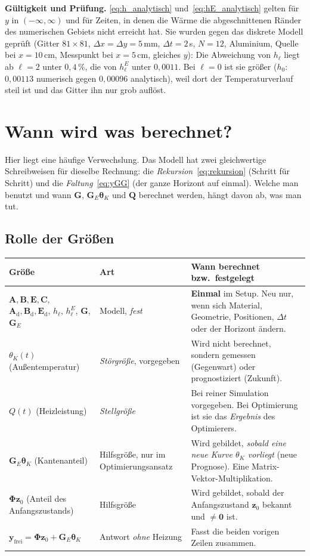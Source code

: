 \documentclass[11pt,a4paper]{article}
\numberwithin{equation}{section}
\newcommand{\dx}{\Delta x}
\newcommand{\dy}{\Delta y}
\newcommand{\dt}{\Delta t}
\newcommand{\thK}{\theta_{K}}
\newcommand{\vthK}{\symbf{\theta}_{K}}
\newcommand{\mA}{\mathbf{A}}
\newcommand{\mB}{\mathbf{B}}
\newcommand{\mE}{\mathbf{E}}
\newcommand{\mC}{\mathbf{C}}
\newcommand{\mG}{\mathbf{G}}
\newcommand{\mGE}{\mathbf{G}_{E}}
\newcommand{\mAd}{\mathbf{A}_{\mathrm d}}
\newcommand{\mBd}{\mathbf{B}_{\mathrm d}}
\newcommand{\mEd}{\mathbf{E}_{\mathrm d}}
\newcommand{\mPhi}{\symbf{\Phi}}
\newcommand{\vz}{\mathbf{z}}
\newcommand{\vy}{\mathbf{y}}
\newcommand{\vQ}{\mathbf{Q}}
\begin{document}
\textbf{Gültigkeit und Prüfung.} \eqref{eq:h_analytisch} und~\eqref{eq:hE_analytisch} gelten für $y$ in $(-\infty,\infty)$ und für Zeiten, in denen die Wärme die abgeschnittenen Ränder des numerischen Gebiets nicht erreicht hat. Sie wurden gegen das diskrete Modell geprüft (Gitter $81\times81$, $\dx=\dy=5$\,mm, $\dt=2$\,s, $N=12$, Aluminium, Quelle bei $x=10$\,cm, Messpunkt bei $x=5$\,cm, gleiches $y$): Die Abweichung von $h_\ell$ liegt ab $\ell=2$ unter $0{,}4\,\%$, die von $h^E_\ell$ unter $0{,}0011$. Bei $\ell=0$ ist sie größer ($h_0$: $0{,}00113$ numerisch gegen $0{,}00096$ analytisch), weil dort der Temperaturverlauf steil ist und das Gitter ihn nur grob auflöst.

\section{Wann wird was berechnet?}
\label{sec:wann}

Hier liegt eine häufige Verwechslung. Das Modell hat zwei gleichwertige Schreibweisen für dieselbe Rechnung: die \emph{Rekursion}~\eqref{eq:rekursion} (Schritt für Schritt) und die \emph{Faltung}~\eqref{eq:yGG} (der ganze Horizont auf einmal). Welche man benutzt und wann $\mG$, $\mGE\vthK$ und $\vQ$ berechnet werden, hängt davon ab, was man tut.

\subsection{Rolle der Größen}

\begin{center}
\small
\begin{tabular}{>{\RaggedRight}p{3.2cm}>{\RaggedRight}p{3.6cm}>{\RaggedRight}p{7.2cm}}
\toprule
Größe & Art & Wann berechnet bzw.\ festgelegt \\
\midrule
$\mA,\mB,\mE,\mC$, $\mAd,\mBd,\mEd$, $h_\ell$, $h^E_\ell$, $\mG$, $\mGE$ & Modell, \emph{fest} & \textbf{Einmal} im Setup. Neu nur, wenn sich Material, Geometrie, Positionen, $\dt$ oder der Horizont ändern. \\
$\thK(t)$ (Außentemperatur) & \emph{Störgröße}, vorgegeben & Wird nicht berechnet, sondern gemessen (Gegenwart) oder prognostiziert (Zukunft). \\
$Q(t)$ (Heizleistung) & \emph{Stellgröße} & Bei reiner Simulation vorgegeben. Bei Optimierung ist sie das \emph{Ergebnis} des Optimierers. \\
$\mGE\vthK$ (Kantenanteil) & Hilfsgröße, nur im Optimierungsansatz & Wird gebildet, \emph{sobald eine neue Kurve $\thK$ vorliegt} (neue Prognose). Eine Matrix-Vektor-Multiplikation. \\
$\mPhi\vz_0$ (Anteil des Anfangszustands) & Hilfsgröße & Wird gebildet, sobald der Anfangszustand $\vz_0$ bekannt und $\neq\mathbf0$ ist. \\
$\vy_\mathrm{frei}=\mPhi\vz_0+\mGE\vthK$ & Antwort \emph{ohne} Heizung & Fasst die beiden vorigen Zeilen zusammen. \\
\bottomrule
\end{tabular}
\end{center}
\end{document}
